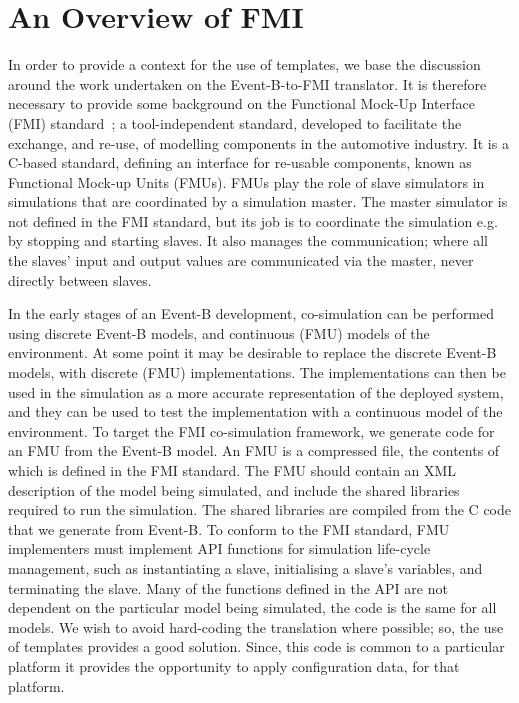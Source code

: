 \documentclass{llncs}%
\begin{document}
\section{An Overview of FMI}\label{FMI}
%
In order to provide a context for the use of templates, we base the discussion around the work undertaken on the Event-B-to-FMI translator. It is therefore necessary to provide some background on the Functional Mock-Up Interface (FMI) standard~\cite{bloch2012,bloch2011,FMISTD}; a tool-independent standard, developed to facilitate the exchange, and re-use, of modelling components in the automotive industry. It is a C-based standard, defining an interface for re-usable components, known as Functional Mock-up Units (FMUs). FMUs play the role of slave simulators in simulations that are coordinated by a simulation master. The master simulator is not defined in the FMI standard, but its job is to coordinate the simulation e.g. by stopping and starting slaves. It also manages the communication; where all the slaves' input and output values are communicated via the master, never directly between slaves. 

In the early stages of an Event-B development, co-simulation can be performed using discrete Event-B models, and continuous (FMU) models of the environment. At some point it may be desirable to replace the discrete Event-B models, with discrete (FMU) implementations. The implementations can then be used in the simulation as a more accurate representation of the deployed system, and they can be used to test the implementation with a continuous model of the environment. To target the FMI co-simulation framework, we generate code for an FMU from the Event-B model. An FMU is a compressed file, the contents of which is defined in the FMI standard. The FMU should contain an XML description of the model being simulated, and include the shared libraries required to run the simulation. The shared libraries are compiled from the C code that we generate from Event-B. To conform to the FMI standard, FMU implementers must implement API functions for simulation life-cycle management, such as instantiating a slave, initialising a slave's variables, and terminating the slave. Many of the functions defined in the API are not dependent on the particular model being simulated, the code is the same for all models. We wish to avoid hard-coding the translation where possible; so, the use of templates provides a good solution. Since, this code is common to a particular platform it provides the opportunity to apply configuration data, for that platform.   
%
\end{document}
